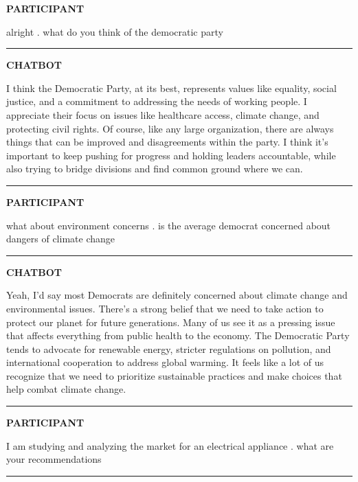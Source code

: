 \documentclass[
  11pt,
  oneside]{article}
\begin{document}
\textbf{PARTICIPANT}

alright . what do you think of the democratic party

\begin{center}\rule{0.5\linewidth}{0.5pt}\end{center}

\textbf{CHATBOT}

I think the Democratic Party, at its best, represents values like
equality, social justice, and a commitment to addressing the needs of
working people. I appreciate their focus on issues like healthcare
access, climate change, and protecting civil rights. Of course, like any
large organization, there are always things that can be improved and
disagreements within the party. I think it's important to keep pushing
for progress and holding leaders accountable, while also trying to
bridge divisions and find common ground where we can.

\begin{center}\rule{0.5\linewidth}{0.5pt}\end{center}

\textbf{PARTICIPANT}

what about environment concerns . is the average democrat concerned
about dangers of climate change

\begin{center}\rule{0.5\linewidth}{0.5pt}\end{center}

\textbf{CHATBOT}

Yeah, I'd say most Democrats are definitely concerned about climate
change and environmental issues. There's a strong belief that we need to
take action to protect our planet for future generations. Many of us see
it as a pressing issue that affects everything from public health to the
economy. The Democratic Party tends to advocate for renewable energy,
stricter regulations on pollution, and international cooperation to
address global warming. It feels like a lot of us recognize that we need
to prioritize sustainable practices and make choices that help combat
climate change.

\begin{center}\rule{0.5\linewidth}{0.5pt}\end{center}

\textbf{PARTICIPANT}

I am studying and analyzing the market for an electrical appliance .
what are your recommendations

\begin{center}\rule{0.5\linewidth}{0.5pt}\end{center}
\end{document}
